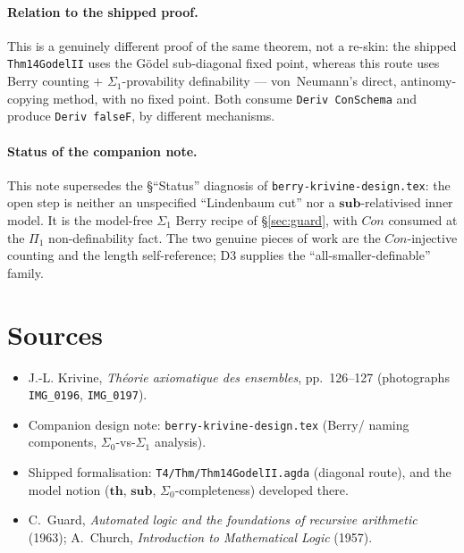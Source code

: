 \documentclass[11pt]{article}
\theoremstyle{plain}
\theoremstyle{definition}
\theoremstyle{remark}
\newcommand{\Con}{\mathit{Con}}
\newcommand{\thmT}{\mathbf{th}}
\newcommand{\sub}{\mathbf{sub}}
\begin{document}
\paragraph{Relation to the shipped proof.}  This is a genuinely
different proof of the same theorem, not a re-skin: the shipped
\texttt{Thm14GodelII} uses the G\"odel sub-diagonal fixed point, whereas
this route uses Berry counting $+$ $\Sigma_1$-provability definability ---
von~Neumann's direct, antinomy-copying method, with no fixed point.  Both
consume \texttt{Deriv ConSchema} and produce \texttt{Deriv falseF}, by
different mechanisms.

\paragraph{Status of the companion note.}  This note supersedes the
{\S}``Status'' diagnosis of \texttt{berry-krivine-design.tex}: the open
step is neither an unspecified ``Lindenbaum cut'' nor a $\sub$-relativised
inner model.  It is the model-free $\Sigma_1$ Berry recipe of
{\S}\ref{sec:guard}, with $\Con$ consumed at the $\Pi_1$ non-definability
fact.  The two genuine pieces of work are the $\Con$-injective counting
and the length self-reference; D3 supplies the ``all-smaller-definable''
family.

\section*{Sources}
\begin{itemize}
\item J.-L. Krivine, \emph{Th\'eorie axiomatique des ensembles},
  pp.~126--127 (photographs \texttt{IMG\_0196}, \texttt{IMG\_0197}).
\item Companion design note: \texttt{berry-krivine-design.tex} (Berry/
  naming components, $\Sigma_0$-vs-$\Sigma_1$ analysis).
\item Shipped formalisation: \texttt{T4/Thm/Thm14GodelII.agda}
  (diagonal route), and the model notion ($\thmT$, $\sub$,
  $\Sigma_0$-completeness) developed there.
\item C.~Guard, \emph{Automated logic and the foundations of recursive
  arithmetic} (1963); A.~Church, \emph{Introduction to Mathematical
  Logic} (1957).
\end{itemize}
\end{document}
